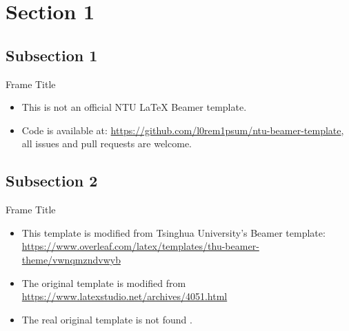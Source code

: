 \section{Section 1}

\subsection{Subsection 1}

\begin{frame}{Frame Title}
    \begin{itemize}[<+-| alert@+>] %
        \item This is not an official NTU \LaTeX{} Beamer template. 
        \item Code is available at: \url{https://github.com/l0rem1psum/ntu-beamer-template}, all issues and pull requests are welcome.
    \end{itemize}
\end{frame}

\subsection{Subsection 2}

\begin{frame}{Frame Title}
    \begin{itemize}
        \item This template is modified from Tsinghua University's Beamer template: \url{https://www.overleaf.com/latex/templates/thu-beamer-theme/vwnqmzndvwyb} \pause
        \item The original template is modified from \newline \url{https://www.latexstudio.net/archives/4051.html}
        \item The real original template is not found \cite{origin}.
    \end{itemize}
\end{frame}